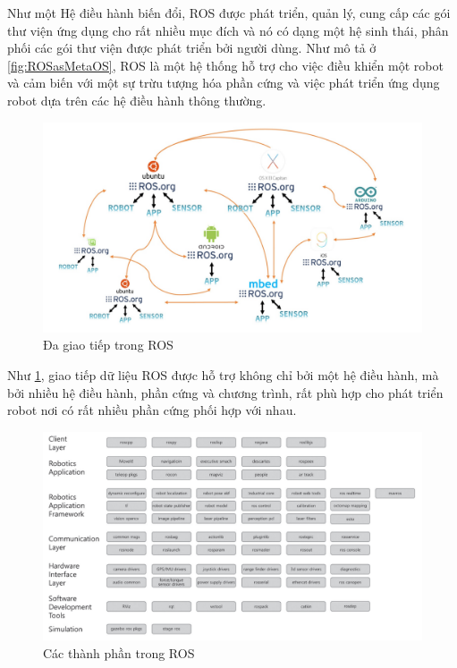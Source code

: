 Như một Hệ điều hành biến đổi, ROS được phát triển, quản lý, cung cấp các gói thư viện ứng dụng cho rất nhiều mục đích và nó có dạng một hệ sinh thái, phân phối các gói thư viện được phát triển bởi người dùng. Như mô tả ở \figurename{\ref{fig:ROSasMetaOS}}, ROS là một hệ thống hỗ trợ cho việc điều khiển một robot và cảm biến với một sự trừu tượng hóa phần cứng và việc phát triển ứng dụng robot dựa trên các hệ điều hành thông thường.

\begin{figure}[htp]
	\centering
	\includegraphics[width=1\linewidth]{chapter2/figs/multi_communication.pdf}
	\caption{Đa giao tiếp trong ROS}
	\label{fig:MultiCommunication}
\end{figure}

Như \figurename{\ref{fig:MultiCommunication}}, giao tiếp dữ liệu ROS được hỗ trợ không chỉ bởi một hệ điều hành, mà bởi nhiều hệ điều hành, phần cứng và chương trình, rất phù hợp cho phát triển robot nơi có rất nhiều phần cứng phối hợp với nhau. 
\cite{Pyo2017}

\begin{figure}[htp]
	\centering
	\includegraphics[width=1\linewidth]{chapter2/figs/components.pdf}
	\caption{Các thành phần trong ROS}
	\label{fig:components}
\end{figure}

